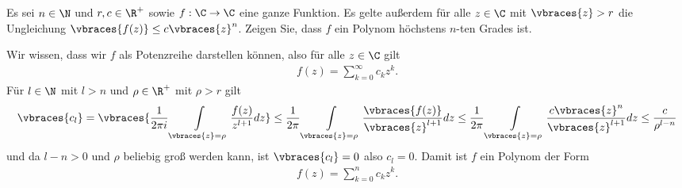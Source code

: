 \begin{exercise}
    Es sei $n \in \N$ und $r,c \in \R^+$ sowie $f:\C \to \C$ eine ganze Funktion. Es gelte außerdem für alle $z \in \C$ mit $\vbraces{z} > r$ die Ungleichung $\vbraces{f(z)} \leq c \vbraces{z}^n$. Zeigen Sie, dass $f$ ein Polynom höchstens $n$-ten Grades ist.
\end{exercise}

\begin{solution}
    Wir wissen, dass wir $f$ als Potenzreihe darstellen können, also für alle $z \in \C$ gilt
    \begin{align*}
        f(z) = \sum_{k = 0}^\infty c_k z^k.
    \end{align*}
    Für $l \in \N$ mit $l > n$ und $\rho \in \R^+$ mit $\rho > r$ gilt
    \begin{align*}
        \vbraces{c_l} = \vbraces{ \frac{1}{2\pi i} \int\limits_{\vbraces{z} = \rho} \frac{f(z)}{z^{l + 1}} dz} \leq \frac{1}{2 \pi} \int\limits_{\vbraces{z} = \rho} \frac{\vbraces{f(z)}}{\vbraces{z}^{l + 1}} dz \leq \frac{1}{2 \pi} \int\limits_{\vbraces{z} = \rho} \frac{c \vbraces{z}^n}{\vbraces{z}^{l + 1}} dz \leq \frac{c}{\rho^{l - n}}
    \end{align*}
    und da $l - n > 0$ und $\rho$ beliebig groß werden kann, ist $\vbraces{c_l} = 0$ also $c_l = 0$. Damit ist $f$ ein Polynom der Form
    \begin{align*}
        f(z) = \sum_{k = 0}^n c_k z^k.
    \end{align*}
\end{solution}
